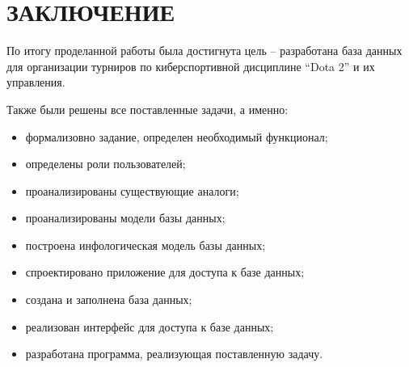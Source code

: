 \chapter*{ЗАКЛЮЧЕНИЕ}

По итогу проделанной работы была достигнута цель – разработана база данных для организации турниров по киберспортивной дисциплине “Dota 2” и их управления.

Также были решены все поставленные задачи, а именно:
\begin{itemize}
	\item формализовно задание, определен необходимый функционал;
	\item определены роли пользователей;
	\item проанализированы существующие аналоги;
	\item проанализированы модели базы данных;
	\item построена инфологическая модель базы данных;
	\item спроектировано приложение для доступа к базе данных;
	\item создана и заполнена база данных;
	\item реализован интерфейс для доступа к базе данных;
	\item разработана программа, реализующая поставленную задачу.
\end{itemize}